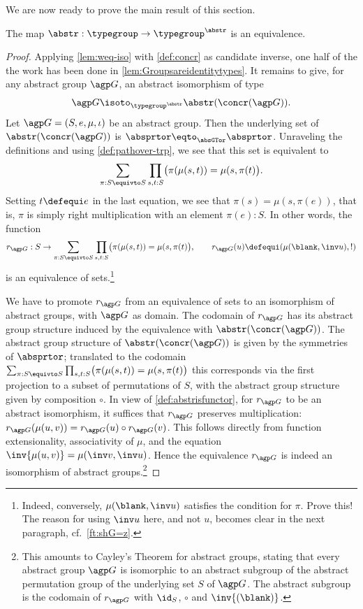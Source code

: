 We are now ready to prove the main result of this section.

\begin{theorem}\label{thm:Groupsareidentitytypes}
The map ${\abstr}:\typegroup\to\typegroup^{\abstr}$ is an equivalence.
\end{theorem}

\begin{proof}
Applying \cref{lem:weq-iso} with \cref{def:concr} as 
candidate inverse, one half of the the work has been done 
in \cref{lem:Groupsareidentitytypes}. It remains to give,
for any abstract group ${\agp G}$, an abstract isomorphism of type
\[
{\agp G}\isoto_{\typegroup^{\abstr}}\abstr(\concr({\agp G})).
\]
Let ${\agp G}=(S,e,\mu,\iota)$ be an abstract group.
Then the underlying set of $\abstr(\concr({\agp G}))$ is 
$\absprtor \eqto_{\absGTor}\absprtor$.
Unraveling the definitions and using \cref{def:pathover-trp},
we see that this set is equivalent to
\[
\sum_{\pi:S\equivto S}\prod_{s,t:S}\bigl(\pi(\mu(s,t))=\mu(s,\pi(t)\bigr).
\]
Setting $t\defequi e$ in the last equation, we see that $\pi(s)=\mu(s,\pi(e))$,
that is, $\pi$ is simply right multiplication with an element $\pi(e):S$.
In other words,
the function
\[
r_{\agp G}:S\to  \sum_{\pi:S\equivto S}\prod_{s,t:S}
\bigl(\pi(\mu(s,t))=\mu(s,\pi(t)\bigr),
\qquad r_{\agp G}(u)\defequi(\mu(\blank,\inv u),!)
\]
is an equivalence of sets.\footnote{Indeed, conversely, $\mu(\blank,\inv u)$
satisfies the condition for $\pi$. Prove this! The reason for
using $\inv u$ here, and not $u$, becomes clear in the next paragraph,
cf.\ \cref{ft:shG=z}.
}

We have to promote $r_{\agp G}$ from an equivalence of sets to
an isomorphism of abstract groups, with $\agp G$ as domain.
The codomain of $r_{\agp G}$ has its abstract group structure induced by
the equivalence with $\abstr(\concr({\agp G}))$.
The abstract group structure of $\abstr(\concr({\agp G}))$ is given by 
the symmetries of $\absprtor$; translated to the codomain
$\sum_{\pi:S\equivto S}\prod_{s,t:S}\bigl(\pi(\mu(s,t))=\mu(s,\pi(t)\bigr)$ 
this corresponds via the first projection to a subset of permutations of $S$,
with the abstract group structure given by composition $\circ$.
In view of \cref{def:abstrisfunctor}, for $r_{\agp G}$ to be an abstract
isomorphism, it suffices that $r_{\agp G}$ preserves multiplication:
$r_{\agp G}(\mu(u,v))=r_{\agp G}(u)\circ r_{\agp G}(v)$.
This follows directly from function extensionality,
associativity of $\mu$,
and the equation $\inv{\mu(u,v)} = \mu(\inv v,\inv u)$.
Hence the equivalence $r_{\agp G}$ is
indeed an isomorphism of abstract groups.\footnote{%
 \label{ft:abstract-Cayley}
 This amounts to Cayley's Theorem for abstract groups,
 stating that every abstract group $\agp G$ is isomorphic to an 
 abstract subgroup of the abstract permutation group of the underlying 
 set $S$ of $\agp G$. The abstract subgroup is the codomain of $r_{\agp G}$
 with $\id_S$, $\circ$ and $\inv{(\blank)}$.
}\qedhere
\end{proof}

